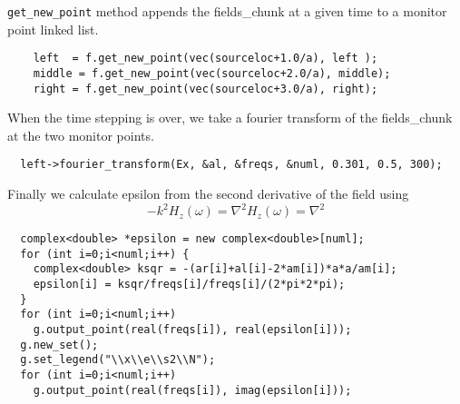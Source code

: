 \verb*|get_new_point| method appends the fields_chunk at a given time to a
monitor point linked list.
\begin{verbatim}
    left  = f.get_new_point(vec(sourceloc+1.0/a), left );
    middle = f.get_new_point(vec(sourceloc+2.0/a), middle);
    right = f.get_new_point(vec(sourceloc+3.0/a), right);
\end{verbatim}
\begin{comment}
    f.step();
  }
  grace g("eps", dirname);
  complex<double> *al, *ar, *am, *freqs;
  int numl, numr;
  printf("Working on left fourier transform...\n");
\end{comment}
When the time stepping is over, we take a fourier transform of the fields_chunk
at the two monitor points.
\begin{verbatim}
  left->fourier_transform(Ex, &al, &freqs, &numl, 0.301, 0.5, 300);
\end{verbatim}
\begin{comment}
  delete[] freqs;
  printf("Working on middle fourier transform...\n");
  middle->fourier_transform(Ex, &am, &freqs, &numr, 0.301, 0.5, 300);
  delete[] freqs;
  printf("Working on right fourier transform...\n");
  right->fourier_transform(Ex, &ar, &freqs, &numr, 0.301, 0.5, 300);
  if (numl != numr) printf("Aaack you need both nums to be the same!\n");
  g.new_set();
  g.set_legend("\\x\\e\\s1\\N");
\end{comment}
Finally we calculate epsilon from the second derivative of the field using
\begin{equation*}
-k^2 H_z(\omega) = \nabla^2 H_z(\omega) = \nabla^2
\end{equation*}
\begin{verbatim}
  complex<double> *epsilon = new complex<double>[numl];
  for (int i=0;i<numl;i++) {
    complex<double> ksqr = -(ar[i]+al[i]-2*am[i])*a*a/am[i];
    epsilon[i] = ksqr/freqs[i]/freqs[i]/(2*pi*2*pi);
  } 
  for (int i=0;i<numl;i++)
    g.output_point(real(freqs[i]), real(epsilon[i]));
  g.new_set();
  g.set_legend("\\x\\e\\s2\\N");
  for (int i=0;i<numl;i++)
    g.output_point(real(freqs[i]), imag(epsilon[i]));
\end{verbatim}
